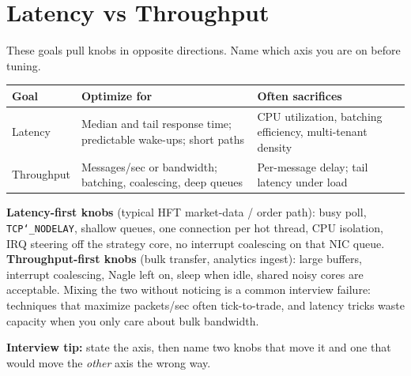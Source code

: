 \section{Latency vs Throughput}
\label{sec:latency-vs-throughput}
These goals pull knobs in opposite directions. Name which axis you are on before tuning.
\begin{center}
\begin{tabular}{|l|p{5.8cm}|p{5.8cm}|}
\hline
\textbf{Goal} & \textbf{Optimize for} & \textbf{Often sacrifices} \\
\hline
Latency & Median and tail response time; 
  predictable wake-ups; short paths & CPU utilization, batching efficiency, 
  multi-tenant density \\
\hline
Throughput & Messages/sec or bandwidth; 
  batching, coalescing, deep queues & Per-message delay; tail latency under load \\
\hline
\end{tabular}
\end{center}
\textbf{Latency-first knobs} (typical HFT market-data / order path): busy poll, 
\texttt{TCP\char`_NODELAY}, shallow queues, one connection per hot thread, CPU isolation, 
IRQ steering off the strategy core, no interrupt coalescing on that NIC queue.
\newline
\textbf{Throughput-first knobs} (bulk transfer, analytics ingest): large buffers, 
interrupt coalescing, Nagle left on, sleep when idle, shared noisy cores are acceptable.
\newline
Mixing the two without noticing is a common interview failure: techniques that maximize 
packets/sec often  tick-to-trade, and latency tricks waste capacity when 
you only care about bulk bandwidth.
\par\noindent\textbf{Interview tip:} state the axis, then name two knobs that move it and 
one that would move the \emph{other} axis the wrong way.
